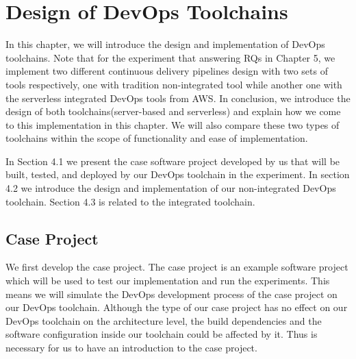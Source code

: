 \chapter{Design of DevOps Toolchains}
In this chapter, we will introduce the design and implementation of DevOps toolchains.
Note that for the experiment that answering RQs in Chapter 5, we implement two different continuous delivery pipelines design with two sets of tools respectively, one with tradition non-integrated tool while another one with the serverless integrated DevOps tools from AWS. In conclusion, we introduce the design of both toolchains(server-based and serverless) and explain how we come to this implementation in this chapter.
We will also compare these two types of toolchains within the scope of functionality and ease of implementation.
\par
In Section 4.1 we present the case software project developed by us that will be built, tested, and deployed by our DevOps toolchain in the experiment. In section 4.2 we introduce the design and implementation of our non-integrated DevOps toolchain. Section 4.3 is related to the integrated toolchain.
\section{Case Project}
We first develop the case project. The case project is an example software project which will be used to test our implementation and run the experiments. This means we will simulate the DevOps development process of the case project on our DevOps toolchain. Although the type of our case project has no effect on our DevOps toolchain on the architecture level, the build dependencies and the software configuration inside our toolchain could be affected by it. Thus is necessary for us to have an introduction to the case project.
